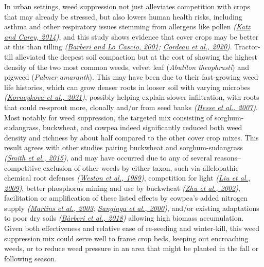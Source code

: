 \documentclass[
  12pt,
]{article}
\begin{document}
In urban settings, weed suppression not just alleviates competition with crops that may already be stressed, but also lowers human health risks, including asthma and other respiratory issues stemming from allergens like pollen \emph{(\protect\hyperlink{ref-katz14}{Katz and Carey, 2014})}, and this study shows evidence that cover crops may be better at this than tilling \emph{(\protect\hyperlink{ref-barberi01}{Barberi and Lo Cascio, 2001}; \protect\hyperlink{ref-cordeau20}{Cordeau et al., 2020})}.
Tractor-till alleviated the deepest soil compaction but at the cost of showing the highest density of the two most common weeds, velvet leaf (\emph{Abutilon theophrasti}) and pigweed (\emph{Palmer amaranth}).
This may have been due to their fast-growing weed life histories, which can grow denser roots in looser soil with varying microbes \emph{(\protect\hyperlink{ref-korneykova21}{Korneykova et al., 2021})}, possibly helping explain slower infiltration, with roots that could re-sprout more, clonally and/or from seed banks \emph{(\protect\hyperlink{ref-hesse07}{Hesse et al., 2007})}.
Most notably for weed suppression, the targeted mix consisting of sorghum-sudangrass, buckwheat, and cowpea indeed significantly reduced both weed density and richness by about half compared to the other cover crop mixes.
This result agrees with other studies pairing buckwheat and sorghum-sudangrass \emph{(\protect\hyperlink{ref-smith15}{Smith et al., 2015})}, and may have occurred due to any of several reasons--competitive exclusion of other weeds by either taxon, such via allelopathic chemical root defenses \emph{(\protect\hyperlink{ref-weston89}{Weston et al., 1989})}, competition for light \emph{(\protect\hyperlink{ref-liu09b}{Liu et al., 2009})}, better phosphorus mining and use by buckwheat \emph{(\protect\hyperlink{ref-zhu02}{Zhu et al., 2002})}, facilitation or amplification of these listed effects by cowpea's added nitrogen supply \emph{(\protect\hyperlink{ref-martins03}{Martins et al., 2003}; \protect\hyperlink{ref-sanginga00}{Sanginga et al., 2000})}, and/or existing adaptations to poor dry soils \emph{(\protect\hyperlink{ref-barberi18}{Bàrberi et al., 2018})} allowing high biomass accumulation.
Given both effectiveness and relative ease of re-seeding and winter-kill, this weed suppression mix could serve well to frame crop beds, keeping out encroaching weeds, or to reduce weed pressure in an area that might be planted in the fall or following season.
\end{document}
